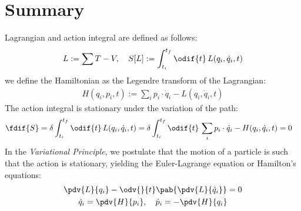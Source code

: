 \section{Summary}
Lagrangian and action integral are defined as follows:
\begin{align}
  L := \sum T - V, \quad S[L] := \int_{t_i}^{t_f} \odif{t} \, L(q_i, \dot{q}_i, t)
\end{align}
we define the Hamiltonian as the Legendre transform of the Lagrangian:
\begin{align}
  H (q_i, p_i, t) := \sum_i p_i \cdot \dot{q}_i - L(q_i, \dot{q}_i, t)
\end{align}
The action integral is stationary under the variation of the path:
\begin{align}
  \fdif{S} & = \delta \int_{t_i}^{t_f} \odif{t} \, L(q_i, \dot{q}_i, t) = \delta \int_{t_i}^{t_f} \odif{t} \, \sum_i p_i \cdot \dot{q}_i - H(q_i, \dot{q}_i, t) = 0
\end{align}
In the \emph{Variational Principle}, we postulate that the motion of a particle is such that the action is stationary, yielding the Euler-Lagrange equation or Hamilton's equations:
\begin{gather}
  \pdv{L}{q_i} - \odv{}{t} \pab{\pdv{L}{\dot{q}_i}}                  = 0                              \\
  \dot{q}_i                                          = \pdv{H}{p_i}, \quad \dot{p}_i = - \pdv{H}{q_i}
\end{gather}
